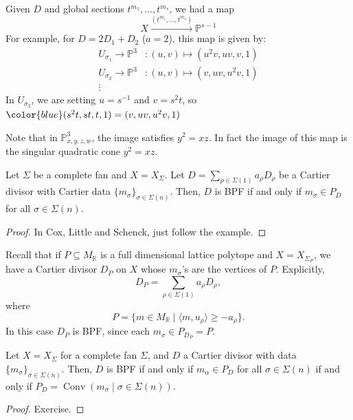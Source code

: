 \documentclass[a4paper,12pt]{amsart}
\newcommand{\RR}{\mathbb{R}}
\newcommand{\PP}{\mathbb{P}}
\DeclareMathOperator{\Conv}{Conv}
\begin{document}
\begin{example}
Given $D$ and global sections $t^{m_1},\dots,t^{m_s}$, we had a map
$$
X \xrightarrow{(t^{m_1},\dots,t^{m_s})} \PP^{s-1}
$$
For example, for $D = 2D_1+D_2$ ($a=2$), this map is given by:
$$
\begin{array}{cl}
U_{\sigma_1} \longrightarrow \PP^3 & : (u,v) \longmapsto (u^2v,uv,v,1) \\
U_{\sigma_2} \longrightarrow \PP^3 & : (u,v) \longmapsto (v,uv,u^2v,1) \\
\vdots
\end{array}
$$
In $U_{\sigma_2}$, we are setting $u = s^{-1}$ and $v=s^2t$, so ${\color{blue}(s^2t,st,t,1)} = (v,uv,u^2v,1)$

Note that in $\PP^3_{x,y,z,w}$, the image satisfies $y^2 = xz$. In fact the image of this map is the singular quadratic cone $y^2 = xz$.
\end{example}

\begin{proposition}
Let $\Sigma$ be a complete fan and $X = X_\Sigma$. Let $D = \sum_{\rho \in \Sigma(1)} a_\rho D_\rho$ be a Cartier divisor with Cartier data $\{m_\sigma\}_{\sigma \in \Sigma(n)}$. Then, $D$ is BPF if and only if $m_\sigma \in P_D$ for all $\sigma \in \Sigma(n)$.
\end{proposition}

\begin{proof}
In Cox, Little and Schenck, just follow the example.
\end{proof}

\begin{remark}
Recall that if $P \subseteq M_\RR$ is a full dimensional lattice polytope and $X = X_{\Sigma_P}$, we have a Cartier divisor $D_P$ on $X$ whose $m_\sigma$'s are the vertices of $P$. Explicitly,
$$
D_P = \sum_{\rho \in \Sigma(1)} a_\rho D_\rho,
$$
where
$$
P = \{ m \in M_\RR \mid \langle m , u_\rho \rangle \geq - a_\rho \}.
$$
In this case $D_P$ is BPF, since each $m_\sigma \in P_{D_P} = P$.
\end{remark}

\begin{proposition}
Let $X = X_\Sigma$ for a complete fan $\Sigma$, and $D$ a Cartier divisor with data $\{m_\sigma\}_{\sigma \in \Sigma(n)}$. Then, $D$ is BPF if and only if $m_\alpha \in P_D$ for all $\sigma \in \Sigma(n)$ if and only if $P_D = \Conv(m_\sigma \mid \sigma \in \Sigma(n))$.
\end{proposition}

\begin{proof}
Exercise.
\end{proof}
\end{document}
